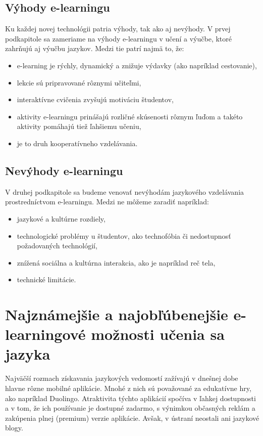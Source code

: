 \documentclass[10pt,oneside,slovak,a4paper]{article}
\begin{document}
\subsection{Výhody e-learningu}%
Ku každej novej technológii patria výhody, tak ako aj nevýhody. V prvej podkapitole sa zameriame na výhody e-learningu v učení a výučbe, ktoré zahrňujú aj výučbu jazykov. Medzi tie patrí najmä to, že:
\begin{itemize}
\item e-learning je rýchly, dynamický a znižuje výdavky (ako napríklad cestovanie), \cite{efektivnost}
\item lekcie sú pripravované rôznymi učiteľmi, \cite{efektivnost}
\item interaktívne cvičenia zvyšujú motiváciu študentov, \cite{vyhody}
\item aktivity e-learningu prinášajú rozličné skúsenosti rôznym ľuďom a takéto aktivity pomáhajú tiež ľahšiemu učeniu, \cite{vyhody}
\item je to druh kooperatívneho vzdelávania. \cite{efektivnost}
\end{itemize}

\subsection{Nevýhody e-learningu}%
V druhej podkapitole sa budeme venovať nevýhodám jazykového vzdelávania prostredníctvom e-learningu. Medzi ne môžeme zaradiť napríklad:

\begin{itemize}
\item jazykové a kultúrne rozdiely, \cite{efektivnost}
\item technologické problémy u študentov, ako technofóbia či  nedostupnosť požadovaných technológií, \cite{nevyhody}
\item znížená sociálna a kultúrna interakcia, ako je napríklad reč tela, \cite{nevyhody}
\item technické limitácie.\cite{efektivnost}
\end{itemize}

\section{Najznámejšie a najobľúbenejšie e-learningové možnosti učenia sa jazyka}%
\label{2}
Najväčší rozmach získavania jazykových vedomostí zažívajú v dnešnej dobe hlavne rôzne mobilné aplikácie. Mnohé z nich sú považované za edukatívne hry, ako napríklad Duolingo. Atraktivita týchto aplikácií spočíva v ľahkej dostupnosti a v tom, že ich používanie je dostupné zadarmo, s výnimkou občasných reklám a zakúpenia plnej (premium) verzie aplikácie. Avšak, v ústraní neostali ani jazykové blogy.
\end{document}
